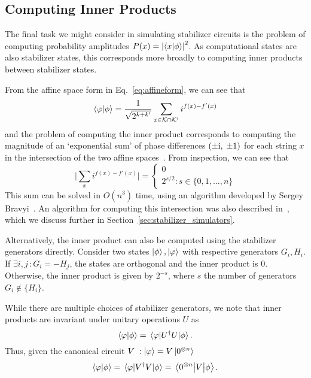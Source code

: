 \subsection{Computing Inner Products}\label{sec:innerproduct}
The final task we might consider in simulating stabilizer circuits is the problem of computing probability amplitudes $P(x)=\left\vert \braket{x}{\phi}\right\vert^{2}$. As computational states are also stabilizer states, this corresponds more broadly to computing inner products between stabilizer states.\par
From the affine space form in Eq.~\ref{eq:affineform}, we can see that
\begin{equation}
\braket{\varphi}{\phi} = \frac{1}{\sqrt{2^{k+k'}}}\sum_{x\in\mathcal{K}\cap\mathcal{K'}} i^{f(x)-f'(x)}\label{eq:affine_ip}
\end{equation}
and the problem of computing the inner product corresponds to computing the magnitude of an `exponential sum' of phase differences $(\pm\mathrm{i},\;\pm 1)$ for each string $x$ in the intersection of the two affine spaces~\cite{Bravyi2016}. From inspection, we can see that
\[
\vert \sum_{x} i^{f(x)-f'(x)}\vert = \begin{cases}
0 \\
2^{s/2} : s\in\{0,1,\dots,n\}
\end{cases}
\]
This sum can be solved in $O(n^{3})$ time, using an algorithm developed by Sergey Bravyi~\cite{Bravyi2016,Bravyi2018,Bravyi2017}. An algorithm for computing this intersection was also described in~\cite{Bravyi2016}, which we discuss further in Section~\ref{sec:stabilizer_simulators}.\par
Alternatively, the inner product can also be computed using the stabilizer generators directly. Consider two states $\ket{\phi},\ket{\varphi}$ with respective generators $G_{i},H_{i}$. If $\exists i,j\,:G_{i}=-H_{j}$, the states are orthogonal and the inner product is $0$. Otherwise, the inner product is given by $2^{-s}$, where $s$ the number of generators $G_{i}\notin \{H_{i}\}$.\par
While there are multiple choices of stabilizer generators, we note that inner products are invariant under unitary operations $U$ as
\[
\braket{\varphi}{\phi} = \matrixel{\varphi}{U^{\dagger}U}{\phi}.
\]
Thus, given the canonical circuit $V\; : \ket{\varphi}=V\ket{0^{\otimes n}}$
\[
\braket{\varphi}{\phi} = \matrixel{\varphi}{V^{\dagger}V}{\phi} = \matrixel{0^{\otimes n}}{V}{\phi}.
\]
